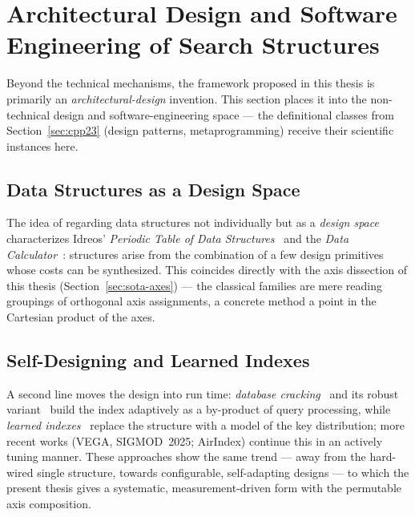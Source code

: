 \section{Architectural Design and Software Engineering of Search Structures}\label{sec:sota-design}
Beyond the technical mechanisms, the framework proposed in this thesis is primarily an
\emph{architectural-design} invention. This section places it into the non-technical design and
software-engineering space --- the definitional classes from Section~\ref{sec:cpp23} (design
patterns, metaprogramming) receive their scientific instances here.

\subsection{Data Structures as a Design Space}\label{ssec:sota-design-space}
The idea of regarding data structures not individually but as a \emph{design space} characterizes
Idreos' \emph{Periodic Table of Data Structures}~\cite{idreos2018periodic} and the
\emph{Data Calculator}~\cite{idreos2018datacalculator}: structures arise from the combination of a
few design primitives whose costs can be synthesized. This coincides directly with the axis
dissection of this thesis (Section~\ref{sec:sota-axes}) --- the classical families are mere reading
groupings of orthogonal axis assignments, a concrete method a point in the Cartesian product of the
axes.

\subsection{Self-Designing and Learned Indexes}\label{ssec:sota-design-selftuning}
A second line moves the design into run time: \emph{database cracking}~\cite{idreos2007cracking} and
its robust variant~\cite{halim2012stochastic} build the index adaptively as a by-product of query
processing, while \emph{learned indexes}~\cite{kraska2018learned} replace the structure with a model
of the key distribution; more recent works (VEGA, SIGMOD~2025; AirIndex) continue this in an
actively tuning manner. These approaches show the same trend --- away from the hard-wired single
structure, towards configurable, self-adapting designs --- to which the present thesis gives a
systematic, measurement-driven form with the permutable axis composition.

